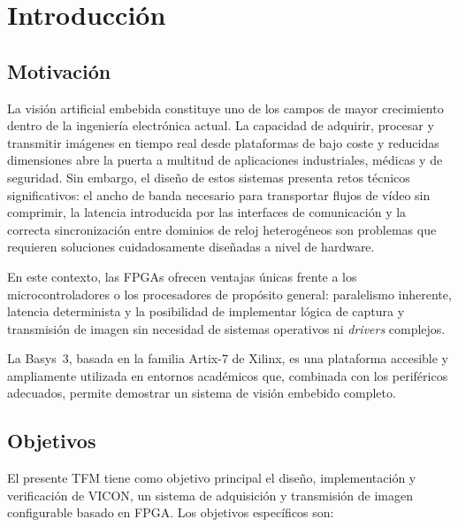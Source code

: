 \documentclass[../main.tex]{subfiles}
\begin{document}
\chapter{Introducción}
\label{chap:introduccion}

\section{Motivación}

La visión artificial embebida constituye uno de los campos de mayor crecimiento dentro de la ingeniería electrónica actual. 
La capacidad de adquirir, procesar y transmitir imágenes en tiempo real desde plataformas de bajo coste y reducidas dimensiones abre la puerta a multitud de aplicaciones industriales, médicas y de seguridad. Sin embargo, el diseño de estos sistemas presenta retos técnicos significativos: el ancho de banda necesario para transportar flujos de vídeo sin comprimir, la latencia introducida por las interfaces de comunicación y la correcta sincronización entre dominios de reloj heterogéneos son problemas que requieren soluciones cuidadosamente diseñadas a nivel de hardware.

En este contexto, las \ac{FPGA}s ofrecen ventajas únicas frente a los microcontroladores o los procesadores de propósito general: paralelismo inherente, latencia determinista y la posibilidad de implementar lógica de captura y transmisión de imagen sin necesidad de sistemas operativos ni \textit{drivers} complejos.

La Basys~3, basada en la familia Artix-7 de Xilinx, es una plataforma accesible y ampliamente utilizada en entornos académicos que, combinada con los periféricos adecuados, permite demostrar un sistema de visión embebido completo.

\section{Objetivos}

El presente \ac{TFM} tiene como objetivo principal el diseño, implementación y verificación de \ac{VICON}, un sistema de adquisición y transmisión de imagen configurable basado en \ac{FPGA}. Los objetivos específicos son:
\end{document}
